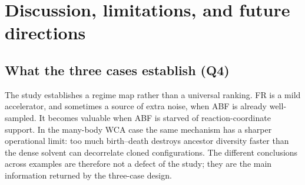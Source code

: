 \section{Discussion, limitations, and future directions}
\label{sec:discussion}

\subsection{What the three cases establish (Q4)}
The study establishes a regime map rather than a universal ranking. FR is a mild
accelerator, and sometimes a source of extra noise, when ABF is already
well-sampled. It becomes valuable when ABF is starved of reaction-coordinate
support. In the many-body WCA case the same mechanism has a sharper operational
limit: too much birth--death destroys ancestor diversity faster than the dense
solvent can decorrelate cloned configurations. The different conclusions across
examples are therefore not a defect of the study; they are the main information
returned by the three-case design.


